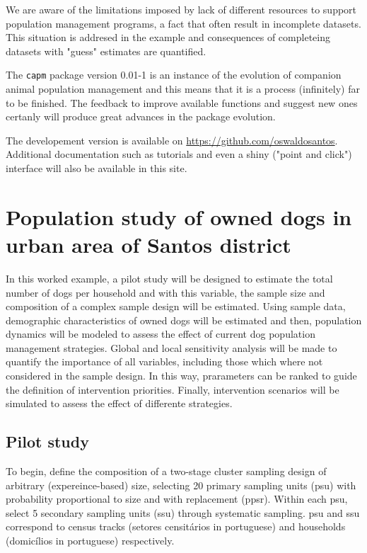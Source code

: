 \documentclass[a4paper]{article}
\begin{document}
We are aware of the limitations imposed by lack of different resources to support population management programs, a fact that often result in incomplete datasets. This situation is  addresed in the example and consequences of completeing datasets with "guess" estimates are quantified.

The \texttt{capm} package version 0.01-1 is an instance of the evolution of companion animal population management and this means that it is a process (infinitely) far to be finished. The feedback to improve available functions and suggest new ones certanly will produce great advances in the package evolution.

The developement version is available on \url{https://github.com/oswaldosantos}. Additional documentation such as tutorials and even a shiny ("point and click") interface will also be available in this site.

\section{Population study of owned dogs in urban area of Santos district}

In this worked example, a pilot study will be designed to estimate the total number of dogs per household and with this variable, the sample size and composition of a complex sample design will be estimated. Using sample data, demographic characteristics of owned dogs will be estimated and then, population dynamics will be modeled to assess the effect of current dog population management strategies. Global and local sensitivity analysis will be made to quantify the importance of all variables, including those which where not considered in the sample design. In this way, prarameters can be ranked to guide the definition of intervention priorities. Finally, intervention scenarios will be simulated to assess the effect of differente strategies.

\subsection{Pilot study}
To begin, define the composition of a two-stage cluster sampling design of arbitrary (expereince-based) size, selecting 20 primary sampling units (psu) with probability proportional to size and with replacement (ppsr). Within each psu, select 5 secondary sampling units (ssu) through systematic sampling. psu and ssu correspond to census tracks (setores censit\'{a}rios in portuguese) and households (domic\'{i}lios in portuguese) respectively.
\end{document}
